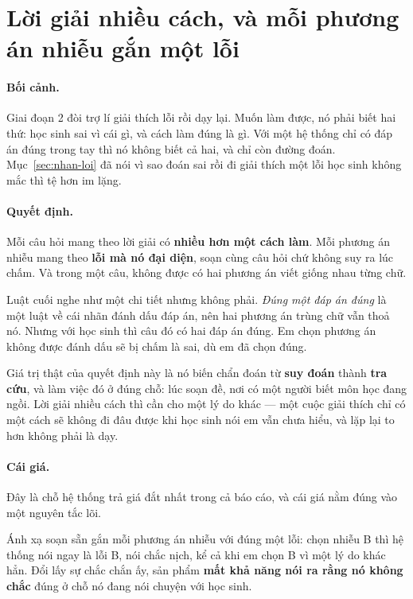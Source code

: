 \section{Lời giải nhiều cách, và mỗi phương án nhiễu gắn một lỗi}

\paragraph{Bối cảnh.} Giai đoạn 2 đòi trợ lí giải thích lỗi rồi dạy lại. Muốn làm được, nó phải
biết hai thứ: học sinh sai vì cái gì, và cách làm đúng là gì. Với một hệ thống chỉ có đáp án
đúng trong tay thì nó không biết cả hai, và chỉ còn đường đoán. Mục~\ref{sec:nhan-loi} đã nói vì
sao đoán sai rồi đi giải thích một lỗi học sinh không mắc thì tệ hơn im lặng.

\paragraph{Quyết định.} Mỗi câu hỏi mang theo lời giải có \textbf{nhiều hơn một cách làm}. Mỗi
phương án nhiễu mang theo \textbf{lỗi mà nó đại diện}, soạn cùng câu hỏi chứ không suy ra lúc
chấm. Và trong một câu, không được có hai phương án viết giống nhau từng chữ.

Luật cuối nghe như một chi tiết nhưng không phải. \emph{Đúng một đáp án đúng} là một luật về cái
nhãn đánh dấu đáp án, nên hai phương án trùng chữ vẫn thoả nó. Nhưng với học sinh thì câu đó có
hai đáp án đúng. Em chọn phương án không được đánh dấu sẽ bị chấm là sai, dù em đã chọn đúng.

Giá trị thật của quyết định này là nó biến chẩn đoán từ \textbf{suy đoán} thành \textbf{tra
cứu}, và làm việc đó ở đúng chỗ: lúc soạn đề, nơi có một người biết môn học đang ngồi. Lời giải
nhiều cách thì cần cho một lý do khác --- một cuộc giải thích chỉ có một cách sẽ không đi đâu
được khi học sinh nói em vẫn chưa hiểu, và lặp lại to hơn không phải là dạy.

\paragraph{Cái giá.} Đây là chỗ hệ thống trả giá đắt nhất trong cả báo cáo, và cái giá nằm
đúng vào một nguyên tắc lõi.

Ánh xạ soạn sẵn gắn mỗi phương án nhiễu với đúng một lỗi: chọn nhiễu B thì hệ thống nói ngay là
lỗi B, nói chắc nịch, kể cả khi em chọn B vì một lý do khác hẳn. Đổi lấy sự chắc chắn ấy, sản
phẩm \textbf{mất khả năng nói ra rằng nó không chắc} đúng ở chỗ nó đang nói chuyện với học sinh.

